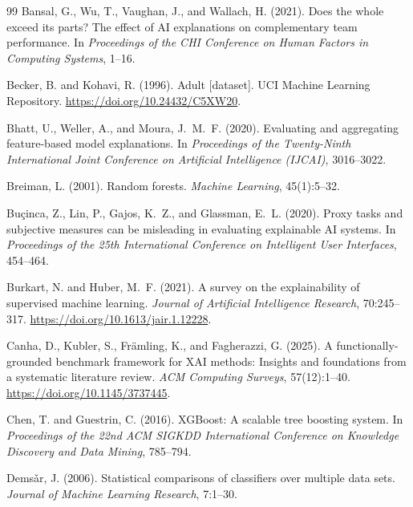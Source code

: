 \documentclass[10pt,a4paper,twoside]{article}
\begin{document}
\begin{thebibliography}{99}
Bansal, G., Wu, T., Vaughan, J., and Wallach, H. (2021).
Does the whole exceed its parts? The effect of AI explanations on
complementary team performance.
In \emph{Proceedings of the CHI Conference on Human Factors in Computing
Systems}, 1--16.

Becker, B. and Kohavi, R. (1996).
Adult [dataset].
UCI Machine Learning Repository.
\url{https://doi.org/10.24432/C5XW20}.

Bhatt, U., Weller, A., and Moura, J.~M.~F. (2020).
Evaluating and aggregating feature-based model explanations.
In \emph{Proceedings of the Twenty-Ninth International Joint Conference on
Artificial Intelligence (IJCAI)}, 3016--3022.

Breiman, L. (2001).
Random forests.
\emph{Machine Learning}, 45(1):5--32.

Bu\c{c}inca, Z., Lin, P., Gajos, K.~Z., and Glassman, E.~L. (2020).
Proxy tasks and subjective measures can be misleading in evaluating
explainable AI systems.
In \emph{Proceedings of the 25th International Conference on Intelligent
User Interfaces}, 454--464.

Burkart, N. and Huber, M.~F. (2021).
A survey on the explainability of supervised machine learning.
\emph{Journal of Artificial Intelligence Research}, 70:245--317.
\url{https://doi.org/10.1613/jair.1.12228}.

Canha, D., Kubler, S., Fr\"{a}mling, K., and Fagherazzi, G. (2025).
A functionally-grounded benchmark framework for XAI methods: Insights
and foundations from a systematic literature review.
\emph{ACM Computing Surveys}, 57(12):1--40.
\url{https://doi.org/10.1145/3737445}.

Chen, T. and Guestrin, C. (2016).
XGBoost: A scalable tree boosting system.
In \emph{Proceedings of the 22nd ACM SIGKDD International Conference on
Knowledge Discovery and Data Mining}, 785--794.

Dems\v{a}r, J. (2006).
Statistical comparisons of classifiers over multiple data sets.
\emph{Journal of Machine Learning Research}, 7:1--30.


\end{thebibliography}
\end{document}
